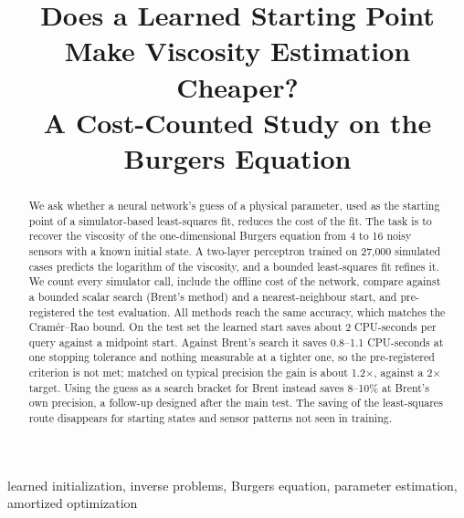 \documentclass[conference]{IEEEtran}
\begin{document}
\title{Does a Learned Starting Point Make Viscosity Estimation Cheaper?\\
A Cost-Counted Study on the Burgers Equation}

\author{
\and
{}
\and
{}
\and
{}
}

\maketitle

\begin{abstract}
We ask whether a neural network's guess of a physical parameter, used as the starting point of a
simulator-based least-squares fit, reduces the cost of the fit. The task is to recover the viscosity of the
one-dimensional Burgers equation from 4 to 16 noisy sensors with a known initial state. A two-layer
perceptron trained on 27{,}000 simulated cases predicts the logarithm of the viscosity, and a bounded
least-squares fit refines it. We count every simulator call, include the offline cost of the network, compare
against a bounded scalar search (Brent's method) and a nearest-neighbour start, and pre-registered the test
evaluation. All methods reach the same accuracy, which matches the Cram\'er--Rao bound. On the test set the
learned start saves about 2 CPU-seconds per query against a midpoint start. Against Brent's search it
saves 0.8--1.1 CPU-seconds at one stopping tolerance and nothing measurable at a tighter one, so the
pre-registered criterion is not met; matched on typical precision the gain is about 1.2$\times$, against a
2$\times$ target. Using the guess as a search bracket for Brent instead saves 8--10\% at Brent's own precision,
a follow-up designed after the main test. The saving of the least-squares route disappears for starting states
and sensor patterns not seen in training.
\end{abstract}

\begin{IEEEkeywords}
learned initialization, inverse problems, Burgers equation, parameter estimation, amortized optimization
\end{IEEEkeywords}






\end{document}
